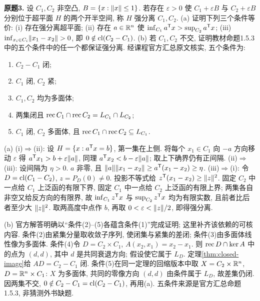 \begin{exercise}\label{ass:6253-hw3-q3}
\textbf{原题3.} 设 $C_1,C_2$ 非空凸, $B=\{x:\lVert x\rVert\le1\}$. 若存在 $\varepsilon>0$ 使 $C_1+\varepsilon B$ 与 $C_2+\varepsilon B$ 分别位于超平面 $H$ 的两个开半空间, 称 $H$ 强分离 $C_1,C_2$.
(a) 证明下列三个条件等价: (i) 存在强分离超平面; (ii) 存在 $a\in\mathbb R^n$ 使 $\inf_{C_1}a^{\mathsf T} x>\sup_{C_2}a^{\mathsf T} x$; (iii) $\inf_{x_i\in C_i}\lVert x_1-x_2\rVert>0$, 即 $0\notin\operatorname{cl}(C_2-C_1)$.
(b) 若 $C_1,C_2$ 不交, 证明教材命题1.5.3中的五个条件中的任一个都保证强分离. 经课程官方汇总原文核实, 五个条件为:
\begin{enumerate}[label=(\arabic*)]
\item $C_2-C_1$ 闭;
\item $C_1$ 闭, $C_2$ 紧;
\item $C_1,C_2$ 均为多面体;
\item 两集闭且 $\operatorname{rec} C_1\cap\operatorname{rec} C_2=L_{C_1}\cap L_{C_2}$;
\item $C_1$ 闭, $C_2$ 多面体, 且 $\operatorname{rec} C_1\cap\operatorname{rec} C_2\subseteq L_{C_1}$.
\end{enumerate}
\end{exercise}
\begin{solution}
(a) (i)$\Rightarrow$(ii): 设 $H=\{x:a^{\mathsf T} x=b\}$, 第一集在上侧. 将每个 $x_1\in C_1$ 向 $-a$ 方向移动 $\varepsilon$ 得 $a^{\mathsf T} x_1>b+\varepsilon\lVert a\rVert$, 同理 $a^{\mathsf T} x_2<b-\varepsilon\lVert a\rVert$; 取上下确界仍有正间隔.
(ii)$\Rightarrow$(iii): 设间隔为 $\eta>0$. $a$ 非零, 且 $\lVert a\rVert\lVert x_1-x_2\rVert\ge a^{\mathsf T}(x_1-x_2)\ge\eta$.
(iii)$\Rightarrow$(i): 令 $D=\operatorname{cl}(C_1-C_2)$, $z=P_D(0)\ne0$. 投影不等式给 $z^{\mathsf T}(x_1-x_2)\ge\lVert z\rVert^2$. 固定 $C_2$ 中一点给 $C_1$ 上泛函的有限下界, 固定 $C_1$ 中一点给 $C_2$ 上泛函的有限上界; 两集各自非空又给反方向的有限界, 故 $\inf_{C_1}z^{\mathsf T} x$ 与 $\sup_{C_2}z^{\mathsf T} x$ 均为有限实数, 且前者比后者至少大 $\lVert z\rVert^2$. 取两高度中点作 $b$, 再取 $0<\varepsilon<\lVert z\rVert/2$, 即得强分离.

(b) 官方解答明确以“条件(2)--(5)各蕴含条件(1)”完成证明; 这里补齐该依赖的可核内容. 条件(2)由紧集分量取收敛子序列, 使闭集与紧集的差闭; 条件(3)由多面体线性像为多面体. 条件(4)令 $D=C_2\times C_1$, $A(x_2,x_1)=x_2-x_1$. 则 $\operatorname{rec} D\cap\ker A$ 中的点为 $(d,d)$, 其中 $d$ 是共同衰退方向; 假设使它属于 $L_D$. 定理\ref{thm:closed-image}给 $AD=C_2-C_1$ 闭. 条件(5)在同一定理的回缩版本中取 $X=C_2\times\mathbb R^n$, $D=\mathbb R^n\times C_1$: $X$ 为多面体, 共同的零像方向 $(d,d)$ 由条件属于 $L_D$, 故差集仍闭. 因两集不交, $0\notin C_2-C_1=\operatorname{cl}(C_2-C_1)$, 再用(a). 五条件来源是官方汇总命题1.5.3, 非猜测外书缺题.
\end{solution}

